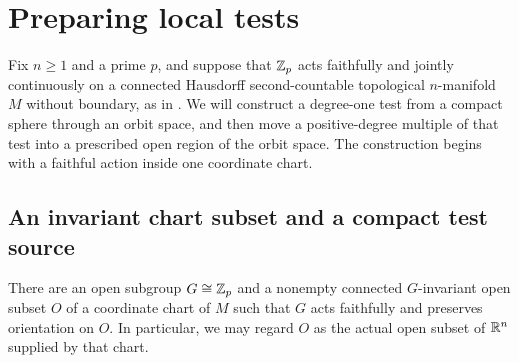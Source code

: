 \section{Preparing local tests}
\label{sec:local-tests}

Fix $n\geq1$ and a prime $p$, and suppose that $\mathbb Z_p$ acts faithfully
and jointly continuously on a connected Hausdorff second-countable
topological $n$-manifold $M$ without boundary, as in .
We will construct a degree-one test from a compact sphere through an
orbit space, and then move a positive-degree multiple of that test
into a prescribed open region of the orbit space.  The construction
begins with a faithful action inside one coordinate chart.

\subsection{An invariant chart subset and a compact test source}

\begin{proposition}
\label{prop:chart-reduction}
There are an open subgroup $G\cong\mathbb Z_p$ and a nonempty connected
$G$-invariant open subset $O$ of a coordinate chart of $M$ such that
$G$ acts faithfully and preserves orientation on $O$.  In particular,
we may regard $O$ as the actual open subset of $\mathbb R^n$ supplied by that
chart.
\end{proposition}

